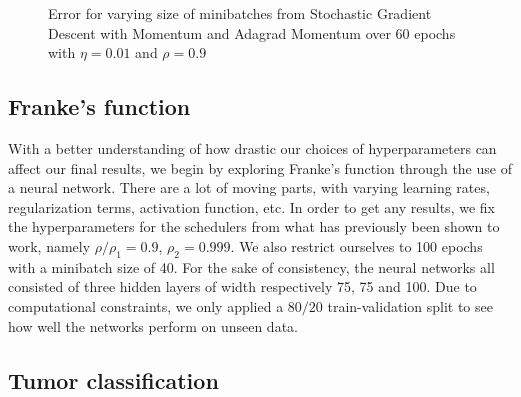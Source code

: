 \documentclass{article}
\theoremstyle{definition}
\begin{document}
\begin{figure}[H]%
    \centering
    \qquad
    \caption{Error for varying size of minibatches from Stochastic Gradient Descent with Momentum and Adagrad Momentum over 60 epochs with $\eta = 0.01$ and $\rho = 0.9$}%
    \label{fig:SGDadagradmomentum}%
\end{figure}

\newpage
\subsection{Franke's function}
With a better understanding of how drastic our choices of hyperparameters can affect our final results, we begin by exploring Franke's function through the use of a neural network. There are a lot of moving parts, with varying learning rates, regularization terms, activation function, etc. In order to get any results, we fix the hyperparameters for the schedulers from what has previously been shown to work, namely $\rho/\rho_1 = 0.9$, $\rho_2 = 0.999$. We also restrict ourselves to 100 epochs with a minibatch size of 40. For the sake of consistency, the neural networks all consisted of three hidden layers of width respectively 75, 75 and 100. Due to computational constraints, we only applied a $80 / 20$ train-validation split to see how well the networks perform on unseen data.

\subsection{Tumor classification}
\end{document}
